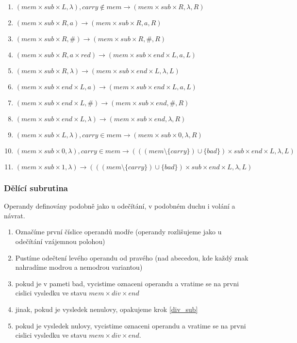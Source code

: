 \documentclass[a4paper,12pt]{article} %
\begin{document}
\begin{enumerate}
    \item $(mem \times sub \times L, \lambda), carry \not\in mem \to (mem \times sub \times R, \lambda, R)$
    \item $(mem \times sub \times R, a) \to (mem \times sub \times R, a, R)$
    \item $(mem \times sub \times R, \#) \to (mem \times sub \times R, \#, R)$
    \item $(mem \times sub \times R, a \times red) \to (mem \times sub \times end \times L, a, L)$
    \item $(mem \times sub \times R, \lambda) \to (mem \times sub \times end \times L, \lambda, L)$
    \item $(mem \times sub \times end \times L, a) \to (mem \times sub \times end \times L, a, L)$
    \item $(mem \times sub \times end \times L, \#) \to (mem \times sub \times end, \#, R)$
    \item $(mem \times sub \times end \times L, \lambda) \to (mem \times sub \times end, \lambda, R)$
    \item $(mem \times sub \times L, \lambda), carry \in mem \to (mem \times sub \times 0, \lambda, R)$
    \item $(mem \times sub \times 0, \lambda), carry \in mem \to (((mem \setminus \{carry\}) \cup \{bad\}) \times sub \times end \times L, \lambda, L)$
    \item $(mem \times sub \times 1, \lambda) \to (((mem \setminus \{carry\}) \cup \{bad\}) \times sub \times end \times L, \lambda, L)$
\end{enumerate}

\subsubsection*{Dělící subrutina}

Operandy definovány podobně jako u odečítání, v podobném duchu i volání a návrat.

\begin{enumerate}
    \item Označíme první číslice operandů modře (operandy rozlišujeme jako u odečítání vzájemnou polohou)
    \item \label{div_sub} Pustíme odečtení levého operandu od pravého (nad abecedou, kde každý znak nahradíme modrou a nemodrou variantou)
    \item pokud je v pameti bad, vycistime oznaceni operandu a vratime se na prvni cislici vysledku ve stavu $mem \times div \times end$
    \item jinak, pokud je vysledek nenulovy, opakujeme krok \ref{div_sub}
    \item pokud je vysledek nulovy, vycistime oznaceni operandu a vratime se na prvni cislici vysledku ve stavu $mem \times div \times end$.
\end{enumerate}
\end{document}
